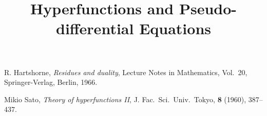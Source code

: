 \documentclass[leqno]{book}
\title{Hyperfunctions and Pseudo-differential Equations}
\author{}
\theoremstyle{plain}
\theoremstyle{definition}
\theoremstyle{remark}
\numberwithin{equation}{subsection}
\begin{document}
\maketitle

\frontmatter

\tableofcontents
{}


\layout
\mainmatter

%











\backmatter

%
\begin{thebibliography}{20}
    \par
     R. Hartshorne, 
    \textit{Residues and duality}, Lecture Notes in Mathematics, 
    Vol.\ 20, Springer-Verlag, Berlin, 1966.

     Mikio Sato, \textit{Theory of hyperfunctions II}, J. Fac.\ Sci.\ Univ.\ Tokyo, {\bf{8}} (1960), 387--437.

    \end{thebibliography}
\end{document}
